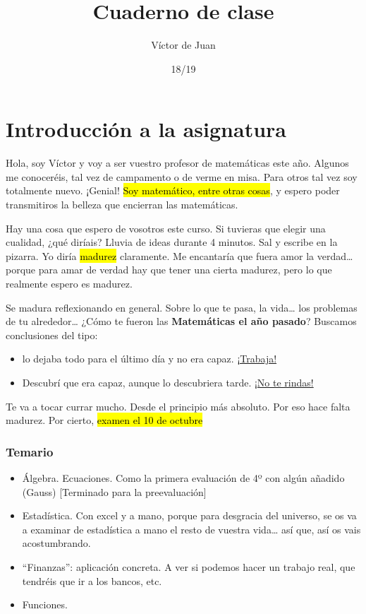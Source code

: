 \documentclass[palatino,nosec]{Docencia}
\title{Cuaderno de clase}
\author{Víctor de Juan}
\date{18/19}
\begin{document}
\pagestyle{plain}
\maketitle
\tableofcontents



\chapter{Introducción a la asignatura}


Hola, soy Víctor y voy a ser vuestro profesor de matemáticas este año. Algunos me conoceréis, tal vez de campamento o de verme en misa. Para otros tal vez soy totalmente nuevo. ¡Genial! \hl{Soy matemático, entre otras cosas}, y espero poder transmitiros la belleza que encierran las matemáticas.

Hay una cosa que espero de vosotros este curso.  Si tuvieras que elegir una cualidad, ¿qué diríais? Lluvia de ideas durante 4 minutos. Sal y escribe en la pizarra. Yo diría \hl{madurez} claramente. Me encantaría que fuera amor la verdad… porque para amar de verdad hay que tener una cierta madurez, pero lo que realmente espero es madurez.

Se madura reflexionando en general. Sobre lo que te pasa, la vida… los problemas de tu alrededor…  ¿Cómo te fueron las \textbf{Matemáticas el año pasado}? Buscamos conclusiones del tipo: 
\begin{itemize}
	\item lo dejaba todo para el último día y no era capaz. \ul{¡Trabaja!}
	\item Descubrí que era capaz, aunque lo descubriera tarde. \ul{¡No te rindas!}
\end{itemize}

Te va a tocar currar mucho. Desde el principio más absoluto. Por eso hace falta madurez. Por cierto, \hl{examen el 10 de octubre}

\subsection{Temario}

\begin{itemize}
	\item Álgebra. Ecuaciones. Como la primera evaluación de 4º con algún añadido (Gauss) [Terminado para la preevaluación]
	\item Estadística. Con excel y a mano, porque para desgracia del universo, se os va a examinar de estadística a mano el resto de vuestra vida… así que, así os vais acostumbrando.
	\item “Finanzas”: aplicación concreta. A ver si podemos hacer un trabajo real, que tendréis que ir a los bancos, etc. 
	\item Funciones.
\end{itemize}
\end{document}
